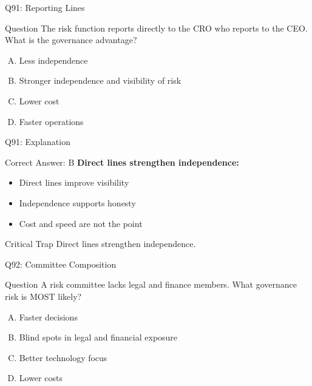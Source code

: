 \documentclass{beamer}
\begin{document}
	\begin{frame}{Q91: Reporting Lines}
		\begin{block}{Question}
			The risk function reports directly to the CRO who reports to the CEO. What is the governance advantage?
		\end{block}
		\begin{enumerate}[(A)]
			\item Less independence
			\item Stronger independence and visibility of risk
			\item Lower cost
			\item Faster operations
		\end{enumerate}
	\end{frame}
	
	\begin{frame}{Q91: Explanation}
		\begin{block}{Correct Answer: B}
			\textbf{Direct lines strengthen independence:}
			\begin{itemize}
				\item Direct lines improve visibility
				\item Independence supports honesty
				\item Cost and speed are not the point
			\end{itemize}
		\end{block}
		\begin{alertblock}{Critical Trap}
			Direct lines strengthen independence.
		\end{alertblock}
	\end{frame}
	
	\begin{frame}{Q92: Committee Composition}
		\begin{block}{Question}
			A risk committee lacks legal and finance members. What governance risk is MOST likely?
		\end{block}
		\begin{enumerate}[(A)]
			\item Faster decisions
			\item Blind spots in legal and financial exposure
			\item Better technology focus
			\item Lower costs
		\end{enumerate}
	\end{frame}
	
\end{document}
